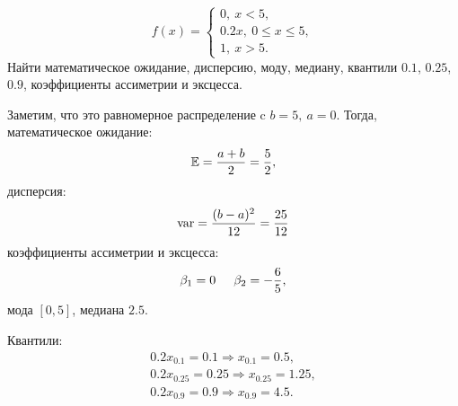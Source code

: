 \documentclass[12pt]{report}
\begin{document}
\[
    f(x) = \left\{
        \begin{array}{c}
            0, \ x < 5,\\
            0.2x, \ 0 \leq x \leq 5,\\
            1, \ x > 5.
        \end{array}
     \right.  
\]
Найти математическое ожидание, дисперсию, моду, медиану, квантили $0.1$, $0.25$, $0.9$, коэффициенты ассиметрии и эксцесса.
\begin{solution}
    Заметим, что это равномерное распределение c $b = 5, \ a = 0$. Тогда, математическое ожидание:
    \[
        \mathbb{E} = \dfrac{a+b}{2} = \dfrac{5}{2},
    \] 
    дисперсия:
    \[
        \operatorname{var} = \dfrac{(b-a)^2}{12} = \dfrac{25}{12}
    \]
    коэффициенты ассиметрии и эксцесса:
    \[
        \beta_1 = 0 \hspace*{0.5cm}  \beta_2 = -\dfrac{6}{5},
    \]
    мода $[0,5]$, медиана $2.5$. 
    \par
    Квантили:
    \begin{gather*}
        0.2x_{0.1} = 0.1 \Rightarrow x_{0.1} = 0.5, \\
        0.2x_{0.25} = 0.25 \Rightarrow x_{0.25} = 1.25, \\
        0.2x_{0.9} = 0.9 \Rightarrow x_{0.9} = 4.5.
    \end{gather*}
\end{solution}
\end{document}
